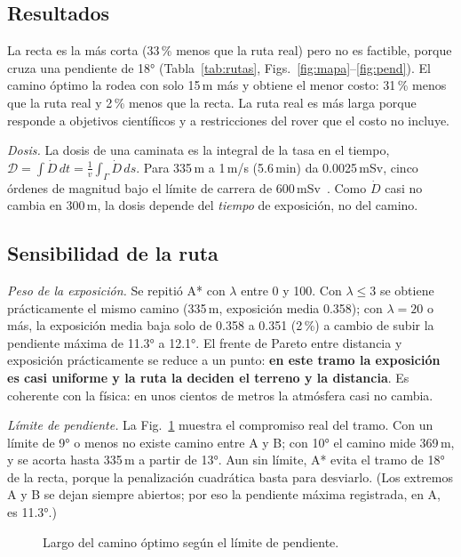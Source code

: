 \documentclass[conference]{IEEEtran}
\begin{document}
\subsection{Resultados}
La recta es la más corta (33\,\% menos que la ruta real) pero no es factible, porque cruza una pendiente de 18° (Tabla~\ref{tab:rutas}, Figs.~\ref{fig:mapa}--\ref{fig:pend}). El camino óptimo la rodea con solo 15\,m más y obtiene el menor costo: 31\,\% menos que la ruta real y 2\,\% menos que la recta. La ruta real es más larga porque responde a objetivos científicos y a restricciones del rover que el costo no incluye.

\emph{Dosis.} La dosis de una caminata es la integral de la tasa en el tiempo, $\mathcal D = \int \dot D\,dt = \frac{1}{v}\int_\Gamma \dot D\,ds$. Para 335\,m a 1\,m/s (5.6\,min) da 0.0025\,mSv, cinco órdenes de magnitud bajo el límite de carrera de 600\,mSv~\cite{nasa_ochmo2025}. Como $\dot D$ casi no cambia en 300\,m, la dosis depende del \emph{tiempo} de exposición, no del camino.

\subsection{Sensibilidad de la ruta}
\emph{Peso de la exposición.} Se repitió A* con $\lambda$ entre 0 y 100. Con $\lambda \le 3$ se obtiene prácticamente el mismo camino (335\,m, exposición media 0.358); con $\lambda = 20$ o más, la exposición media baja solo de 0.358 a 0.351 (2\,\%) a cambio de subir la pendiente máxima de 11.3° a 12.1°. El frente de Pareto entre distancia y exposición prácticamente se reduce a un punto: \textbf{en este tramo la exposición es casi uniforme y la ruta la deciden el terreno y la distancia}. Es coherente con la física: en unos cientos de metros la atmósfera casi no cambia.

\emph{Límite de pendiente.} La Fig.~\ref{fig:limite} muestra el compromiso real del tramo. Con un límite de 9° o menos no existe camino entre A y B; con 10° el camino mide 369\,m, y se acorta hasta 335\,m a partir de 13°. Aun sin límite, A* evita el tramo de 18° de la recta, porque la penalización cuadrática basta para desviarlo. (Los extremos A y B se dejan siempre abiertos; por eso la pendiente máxima registrada, en A, es 11.3°.)

\begin{figure}[t]
\centering
{}
\caption{Largo del camino óptimo según el límite de pendiente.}
\label{fig:limite}
\end{figure}
\end{document}
